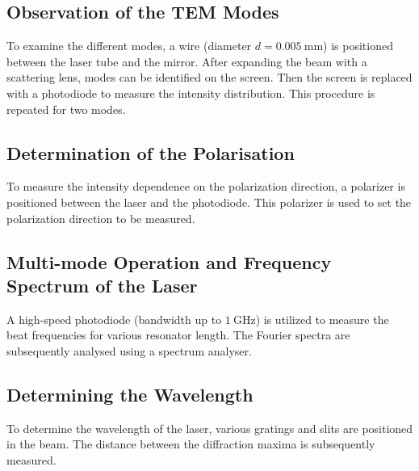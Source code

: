 \subsection{Observation of the TEM Modes}
To examine the different modes, a wire (diameter $d=\SI{0.005}{\milli\meter}$)
is positioned between the laser tube and the mirror. After expanding 
the beam with a scattering lens, modes can be identified on the screen.
Then the screen is replaced with a photodiode to measure the intensity
distribution. This procedure is repeated for two modes.

\subsection{Determination of the Polarisation}
To measure the intensity dependence on the polarization direction, a 
polarizer is positioned between the laser and the photodiode. This 
polarizer is used to set the polarization direction to be measured.

\subsection{Multi-mode Operation and Frequency Spectrum of the Laser}

A high-speed photodiode (bandwidth up to $\SI{1}{\giga\hertz}$) is 
utilized to measure the beat frequencies for various resonator length. 
The Fourier spectra are subsequently analysed using a spectrum analyser.

\subsection{Determining the Wavelength}
To determine the wavelength of the laser, various gratings and slits are 
positioned in the beam. The distance between the diffraction maxima is 
subsequently measured.
